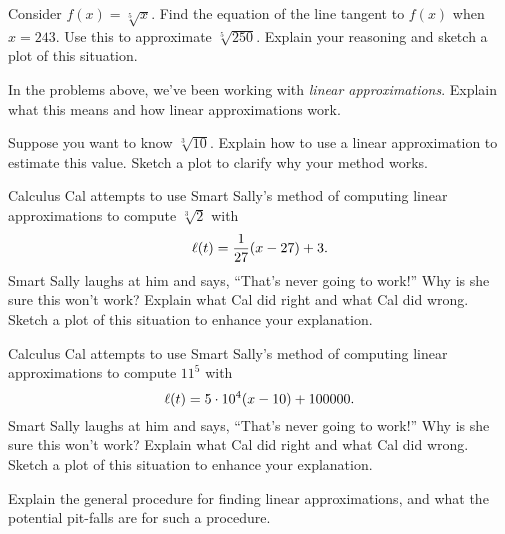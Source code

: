 \documentclass{ximera}
\begin{document}
\begin{problem}
Consider $f(x) = \sqrt[5]{x}$. Find the equation of the line tangent
to $f(x)$ when $x= 243$. Use this to approximate
$\sqrt[5]{250}$. Explain your reasoning and sketch a plot of this
situation.
\end{problem}

\begin{problem}
In the problems above, we've been working with \textit{linear
approximations}. Explain what this means and how linear approximations
work.
\end{problem}

\begin{problem}
Suppose you want to know $\sqrt[3]{10}$. Explain how to use a linear
approximation to estimate this value. Sketch a plot to clarify why
your method works.
\end{problem}


\begin{problem}
Calculus Cal attempts to use Smart Sally's method of computing linear
approximations to compute $\sqrt[3]{2}$ with
\[
\ell(t) = \frac{1}{27}(x-27)+3.
\] 
Smart Sally laughs at him and says, ``That's never going to work!''
Why is she sure this won't work? Explain what Cal did right and what
Cal did wrong. Sketch a plot of this situation to enhance your
explanation.
\end{problem}

\begin{problem}
Calculus Cal attempts to use Smart Sally's method of computing linear
approximations to compute $11^5$ with
\[
\ell(t) = 5\cdot 10^4(x-10)+100000.
\] 
Smart Sally laughs at him and says, ``That's never going to work!''
Why is she sure this won't work? Explain what Cal did right and what
Cal did wrong. Sketch a plot of this situation to enhance your
explanation.
\end{problem}

\begin{problem}
Explain the general procedure for finding linear approximations, and
what the potential pit-falls are for such a procedure.
\end{problem}






\end{document}
